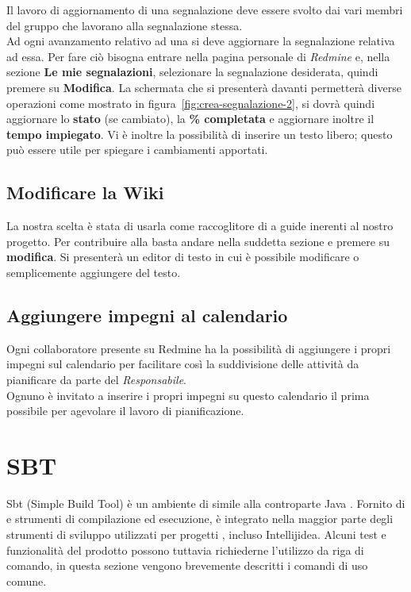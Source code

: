 \documentclass{scalatekids-article}
\begin{document}
Il lavoro di aggiornamento di una segnalazione deve essere svolto dai vari
membri del gruppo che lavorano alla segnalazione stessa.\\ Ad ogni avanzamento
relativo ad una  si deve aggiornare la segnalazione relativa ad
essa. Per fare ciò bisogna entrare nella pagina personale di \textit{Redmine} e,
nella sezione \textbf{Le mie segnalazioni}, selezionare la segnalazione
desiderata, quindi premere su \textbf{Modifica}. La schermata che si presenterà
davanti permetterà diverse operazioni come mostrato in figura~\ref{fig:crea-segnalazione-2},
si dovrà quindi aggiornare lo \textbf{stato} (se
cambiato), la \textbf{\% completata} e aggiornare inoltre il \textbf{tempo
  impiegato}. Vi è inoltre la possibilità di inserire un testo libero; questo
può essere utile per spiegare i cambiamenti apportati.

\subsection{Modificare la Wiki}

La nostra scelta è stata di usarla come raccoglitore di  a guide inerenti al nostro progetto.
Per contribuire alla  basta andare nella suddetta sezione e premere su \textbf{modifica}. Si presenterà un editor di testo in cui è possibile modificare o semplicemente aggiungere del testo.

\subsection{Aggiungere impegni al calendario}

Ogni collaboratore presente su Redmine ha la possibilità di aggiungere i propri impegni sul calendario per facilitare così la suddivisione delle attività da pianificare da parte del \textit{Responsabile}.\\
Ognuno è invitato a inserire i propri impegni su questo calendario il prima possibile per agevolare il lavoro di pianificazione.

\section{SBT}

Sbt (Simple Build Tool) è un ambiente di  simile alla controparte Java . Fornito di  e strumenti di compilazione ed
esecuzione, è integrato nella maggior parte degli strumenti di sviluppo utilizzati per progetti , incluso Intellijidea. Alcuni test e funzionalità
del prodotto possono tuttavia richiederne l'utilizzo da riga di comando, in questa sezione vengono brevemente descritti i comandi di uso comune.
\end{document}

